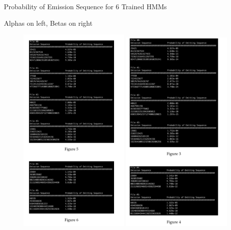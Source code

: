 \indent\problem[17] %
Probability of Emission Sequence for 6 Trained HMMs
\begin{subsolution}

Alphas on left, Betas on right

\begin{figure}[H]
	\centering
	\includegraphics[width=0.49\textwidth]{img/set6template-18d875f7.png}
  \includegraphics[width=0.49\textwidth]{img/set6template-438f3e5e.png}
	\caption{}
	\label{}
\end{figure}



\end{subsolution}
\clearpage


